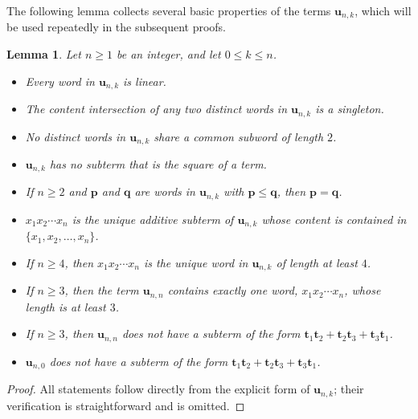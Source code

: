 \documentclass[reqno]{amsart}
\theoremstyle{plain}
\newtheorem{lem}[thm]{Lemma}
\theoremstyle{definition}
\newcommand{\bp}{\mathbf{p}}
\newcommand{\bq}{\mathbf{q}}
\newcommand{\bt}{\mathbf{t}}
\newcommand{\bu}{\mathbf{u}}
\begin{document}
The following lemma collects several basic properties of the terms $\mathbf{u}_{n,k}$,
which will be used repeatedly in the subsequent proofs.
\begin{lem}\label{lem26011801}
Let $n\geq 1$ be an integer, and let $0\leq k\leq n$.
\begin{itemize}
\item[(a)] Every word in $\bu_{n,k}$ is linear.

\item[(b)] The content intersection of any two distinct words in $\bu_{n,k}$ is a singleton.

\item[(c)] No distinct words in $\bu_{n,k}$ share a common subword of length $2$.

\item[(d)] $\bu_{n,k}$ has no subterm that is the square of a term.

\item[(e)] If $n\geq 2$ and $\bp$ and $\bq $ are words in $\bu_{n,k}$ with $\bp \leq\bq$, then $\bp=\bq$.

\item[(f)] $x_1x_2\cdots x_n$ is the unique additive subterm of $\bu_{n,k}$
whose content is contained in $\{x_1, x_2, \ldots, x_n\}$.

\item[(g)] If $n\geq 4$, then $x_1x_2\cdots x_n$ is the unique word in $\bu_{n, k}$ of length at least $4$.

\item[(h)]
If $n\geq 3$, then
the term $\bu_{n, n}$ contains exactly one word, $x_1x_2\cdots x_n$, whose length is at least $3$.

\item[(i)]
If $n\geq 3$, then
$\bu_{n, n}$ does not have a subterm of the form $\bt_1\bt_2+\bt_2\bt_3+\bt_3\bt_1$.

\item[(j)]
$\bu_{n, 0}$ does not have a subterm of the form $\bt_1\bt_2+\bt_2\bt_3+\bt_3\bt_1$.
\end{itemize}
\end{lem}
\begin{proof}
All statements follow directly from the explicit form of $\bu_{n,k}$;
their verification is straightforward and is omitted.
\end{proof}
\end{document}
